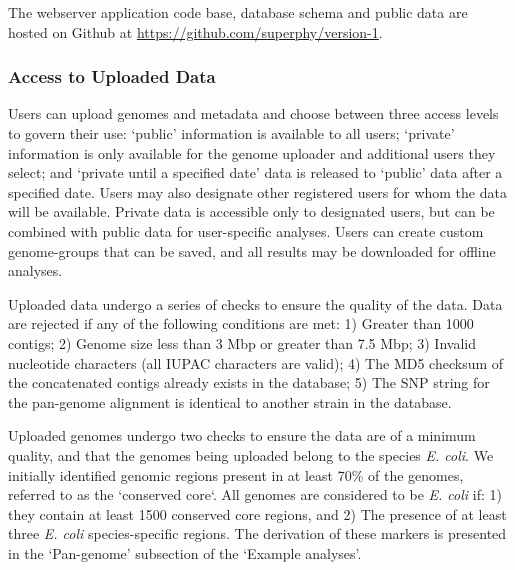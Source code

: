 \documentclass[doublespacing, linenumbers]{bmcart}
\begin{document}
The webserver application code base, database schema and public data are hosted on Github at \url{https://github.com/superphy/version-1}.

\subsubsection{Access to Uploaded Data}
Users can upload genomes and metadata and choose between three access levels to govern their use: `public' information is available to all users; `private' information is only available for the genome uploader and additional users they select; and `private until a specified date' data is released to `public' data after a specified date. Users may also designate other registered users for whom the data will be available. Private data is accessible only to designated users, but can be combined with public data for user-specific analyses. Users can create custom genome-groups that can be saved, and all results may be downloaded for offline analyses.

Uploaded data undergo a series of checks to ensure the quality of the data. Data are rejected if any of the following conditions are met: 1) Greater than 1000 contigs; 2) Genome size less than 3 Mbp or greater than 7.5 Mbp; 3) Invalid nucleotide characters (all IUPAC characters are valid); 4) The MD5 checksum of the concatenated contigs already exists in the database; 5) The SNP string for the pan-genome alignment is identical to another strain in the database.

Uploaded genomes undergo two checks to ensure the data are of a minimum quality, and that the genomes being uploaded belong to the species \textit{E. coli}. We initially identified genomic regions present in at least 70\% of the genomes, referred to as  the `conserved core`. All genomes are considered to be \textit{E. coli} if: 1) they contain at least 1500 conserved core regions, and 2) The presence of at least three \textit{E. coli} species-specific regions. The derivation of these markers is presented in the `Pan-genome' subsection of the `Example analyses'. 
\end{document}
